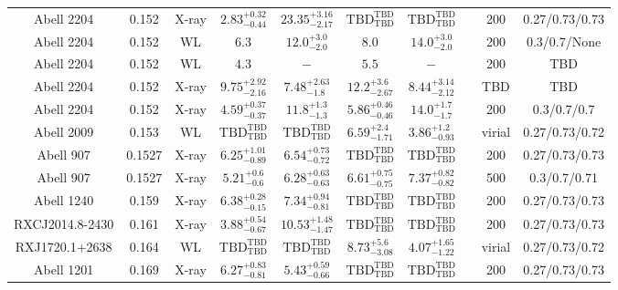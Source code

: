 \begin{table}
\begin{tabular}{cccccccccc}
Abell 2204 & 0.152 & X-ray & ${2.83}^{+0.32}_{-0.44}$ & ${23.35}^{+3.16}_{-2.17}$ & ${\mathrm{TBD}}^{\mathrm{TBD}}_{\mathrm{TBD}}$ & ${\mathrm{TBD}}^{\mathrm{TBD}}_{\mathrm{TBD}}$ & \citet{BA14.1} & 200 & 0.27/0.73/0.73 \\
Abell 2204 & 0.152 & WL & ${6.3}^{}_{}$ & ${12.0}^{+3.0}_{-2.0}$ & ${8.0}^{}_{}$ & ${14.0}^{+3.0}_{-2.0}$ & \citet{CL02.1} & 200 & 0.3/0.7/None \\
Abell 2204 & 0.152 & WL & ${4.3}^{}_{}$ & ${-}^{}_{}$ & ${5.5}^{}_{}$ & ${-}^{}_{}$ & \citet{CL01.1} & 200 & TBD \\
Abell 2204 & 0.152 & X-ray & ${9.75}^{+2.92}_{-2.16}$ & ${7.48}^{+2.63}_{-1.8}$ & ${12.2}^{+3.6}_{-2.67}$ & ${8.44}^{+3.14}_{-2.12}$ & \citet{SC06.1} & TBD & TBD \\
Abell 2204 & 0.152 & X-ray & ${4.59}^{+0.37}_{-0.37}$ & ${11.8}^{+1.3}_{-1.3}$ & ${5.86}^{+0.46}_{-0.46}$ & ${14.0}^{+1.7}_{-1.7}$ & \citet{PO05.1} & 200 & 0.3/0.7/0.7 \\
Abell 2009 & 0.153 & WL & ${\mathrm{TBD}}^{\mathrm{TBD}}_{\mathrm{TBD}}$ & ${\mathrm{TBD}}^{\mathrm{TBD}}_{\mathrm{TBD}}$ & ${6.59}^{+2.4}_{-1.71}$ & ${3.86}^{+1.2}_{-0.93}$ & \citet{OK10.1} & virial & 0.27/0.73/0.72 \\
Abell 907 & 0.1527 & X-ray & ${6.25}^{+1.01}_{-0.89}$ & ${6.54}^{+0.73}_{-0.72}$ & ${\mathrm{TBD}}^{\mathrm{TBD}}_{\mathrm{TBD}}$ & ${\mathrm{TBD}}^{\mathrm{TBD}}_{\mathrm{TBD}}$ & \citet{BA14.1} & 200 & 0.27/0.73/0.73 \\
Abell 907 & 0.1527 & X-ray & ${5.21}^{+0.6}_{-0.6}$ & ${6.28}^{+0.63}_{-0.63}$ & ${6.61}^{+0.75}_{-0.75}$ & ${7.37}^{+0.82}_{-0.82}$ & \citet{VI05.1} & 500 & 0.3/0.7/0.71 \\
Abell 1240 & 0.159 & X-ray & ${6.38}^{+0.28}_{-0.15}$ & ${7.34}^{+0.94}_{-0.81}$ & ${\mathrm{TBD}}^{\mathrm{TBD}}_{\mathrm{TBD}}$ & ${\mathrm{TBD}}^{\mathrm{TBD}}_{\mathrm{TBD}}$ & \citet{BA14.1} & 200 & 0.27/0.73/0.73 \\
RXCJ2014.8-2430 & 0.161 & X-ray & ${3.88}^{+0.54}_{-0.67}$ & ${10.53}^{+1.48}_{-1.47}$ & ${\mathrm{TBD}}^{\mathrm{TBD}}_{\mathrm{TBD}}$ & ${\mathrm{TBD}}^{\mathrm{TBD}}_{\mathrm{TBD}}$ & \citet{BA14.1} & 200 & 0.27/0.73/0.73 \\
RXJ1720.1+2638 & 0.164 & WL & ${\mathrm{TBD}}^{\mathrm{TBD}}_{\mathrm{TBD}}$ & ${\mathrm{TBD}}^{\mathrm{TBD}}_{\mathrm{TBD}}$ & ${8.73}^{+5.6}_{-3.08}$ & ${4.07}^{+1.65}_{-1.22}$ & \citet{OK10.1} & virial & 0.27/0.73/0.72 \\
Abell 1201 & 0.169 & X-ray & ${6.27}^{+0.83}_{-0.81}$ & ${5.43}^{+0.59}_{-0.66}$ & ${\mathrm{TBD}}^{\mathrm{TBD}}_{\mathrm{TBD}}$ & ${\mathrm{TBD}}^{\mathrm{TBD}}_{\mathrm{TBD}}$ & \citet{BA14.1} & 200 & 0.27/0.73/0.73 \\

\end{tabular}
\end{table}
